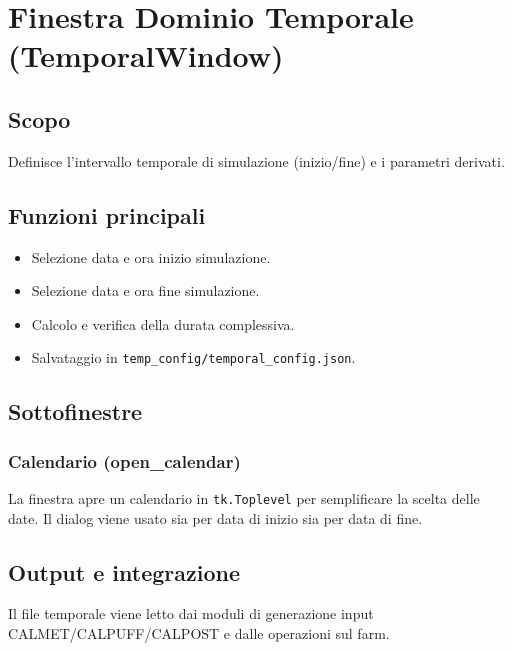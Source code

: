 \chapter{Finestra Dominio Temporale (TemporalWindow)}

\section{Scopo}
Definisce l'intervallo temporale di simulazione (inizio/fine) e i parametri derivati.

\section{Funzioni principali}
\begin{itemize}[leftmargin=1.5em]
  \item Selezione data e ora inizio simulazione.
  \item Selezione data e ora fine simulazione.
  \item Calcolo e verifica della durata complessiva.
  \item Salvataggio in \texttt{temp\_config/temporal\_config.json}.
\end{itemize}

\section{Sottofinestre}
\subsection{Calendario (open\_calendar)}
La finestra apre un calendario in \texttt{tk.Toplevel} per semplificare la scelta delle date.
Il dialog viene usato sia per data di inizio sia per data di fine.

\section{Output e integrazione}
Il file temporale viene letto dai moduli di generazione input CALMET/CALPUFF/CALPOST e dalle operazioni sul farm.
